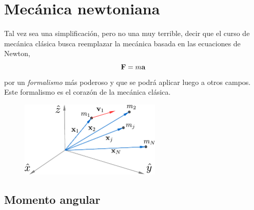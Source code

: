 \documentclass[10pt,oneside]{CBFT_book}
\begin{document}
\chapter{Mecánica newtoniana}

Tal vez sea una simplificación, pero no una muy terrible, decir que el curso de mecánica clásica
busca reemplazar la mecánica basada en las ecuaciones de Newton,
\[
	\vb{F} = m \vb{a}
\]
por un {\it formalismo} más poderoso y que se podrá aplicar luego a otros campos.
Este formalismo es el corazón de la mecánica clásica.


\begin{figure}[hbt]
	\begin{center}
	\includegraphics[width=0.6\textwidth]{images/fig_mc_leyes_cons.pdf}
	\end{center}
	\caption{}
	\label{fig_mc_leyes_cons}
\end{figure} 


\section{Momento angular}
\end{document}
